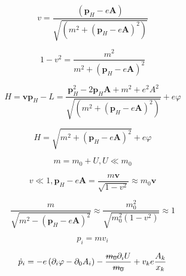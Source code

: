 \begin{solution}
\begin{solution}
	$$
	v = \frac{\left(\boldsymbol{p}_H-e\boldsymbol{A}\right)}{\sqrt{\left(m^2 + \left(\boldsymbol{p}_H-e\boldsymbol{A}\right)^2\right)}}
	$$
	
	
	
	$$	
	1- v^2 = \frac{m^2}{m^2 + \left(\boldsymbol{p}_H-e\boldsymbol{A}\right)^2}
	$$
	
	$$
	H = \boldsymbol{v}\boldsymbol{p}_H - L = \frac{\boldsymbol{p}^2_H - 2 \boldsymbol{p}_H \boldsymbol{A} + m^2  + e^2 A^2 }{\sqrt{\left(m^2 + \left(\boldsymbol{p}_H-e\boldsymbol{A}\right)^2\right)}} + e \varphi
	$$
	
	$$
	H= \sqrt{m^2 + \left(\boldsymbol{p}_H - e \boldsymbol{A}\right)^2} + e \varphi
	$$
	
	
	$$
	m = m_0 + U , U \ll m_0
	$$
	
	
	$$
	v \ll 1 ,  \boldsymbol{p}_H  - e \boldsymbol{A} = \frac{ m \boldsymbol{v}}{\sqrt{1-v^2}}\approx m_0 \boldsymbol{v}
	$$
	
	
	$$
	\frac{m}{\sqrt{m^2 - \left(\boldsymbol{p}_H - e\boldsymbol{A}\right)^2}}\approx \frac{m_{0}^2}{\sqrt{m_{0}^2\left(1-v^2\right)}}\approx 1
	$$
	
	
	$$
	p_i = m v_i
	$$
	
	$$
	\dot{p}_i = - e \left(\partial_i \varphi  - \partial_0 A_i\right) - \frac{\stkout{m_0} \partial_i U}{\stkout{m_0}} + v_k e \frac{A_k}{x_k}
	$$
	\end{solution}


\end{solution}



	